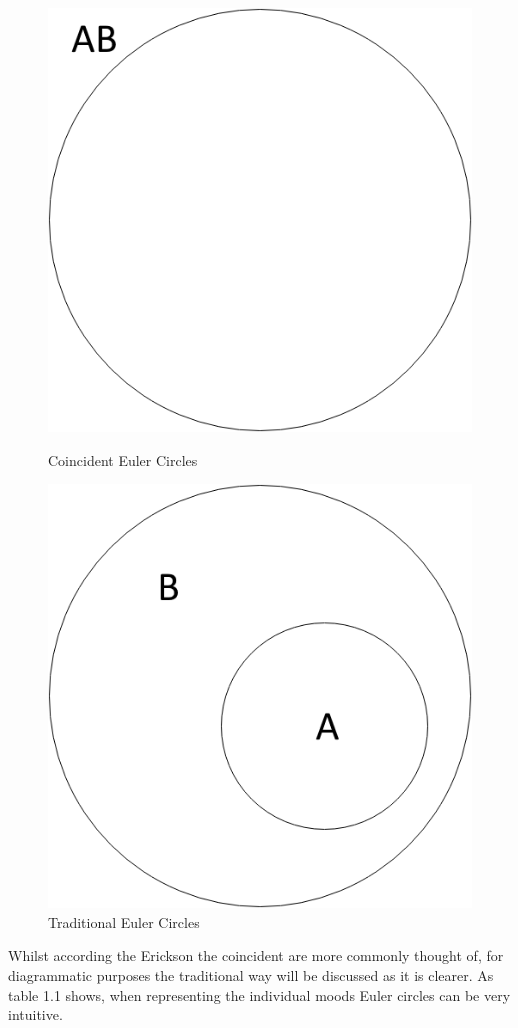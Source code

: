 \documentclass[12pt,a4paper]{report}
\begin{document}
\begin{figure}[!h]
  \centering
  \begin{minipage}[b]{0.4\textwidth}
    \includegraphics[width=\textwidth]{EulerCoincident}
    \caption{Coincident Euler Circles }
  \end{minipage}
  \hfill
  \begin{minipage}[b]{0.4\textwidth}
    \includegraphics[width=\textwidth]{EulerCircles}
    \caption{Traditional Euler Circles}
  \end{minipage}
\end{figure}
\FloatBarrier
Whilst according the Erickson the coincident are more commonly thought of, for diagrammatic purposes the traditional way will be discussed as it is clearer. As table 1.1 shows, when representing the individual moods Euler circles can be very intuitive.
\end{document}
